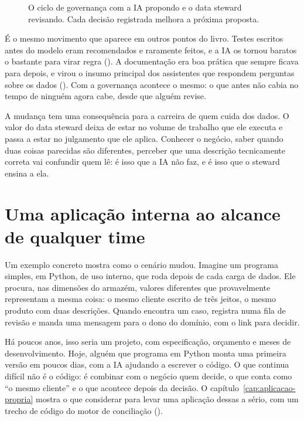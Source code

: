 \begin{figure}[htbp]
  \centering
  
  \caption{O ciclo de governança com a IA propondo e o data steward revisando. Cada
    decisão registrada melhora a próxima proposta.}
  \label{fig:governanca-ciclo}
\end{figure}

É o mesmo movimento que aparece em outros pontos do livro. Testes escritos antes do modelo
eram recomendados e raramente feitos, e a IA os tornou baratos o bastante para virar regra
(). A documentação era boa prática que sempre ficava para depois, e virou o
insumo principal dos assistentes que respondem perguntas sobre os dados
(). Com a governança acontece o mesmo: o que antes não cabia no
tempo de ninguém agora cabe, desde que alguém revise.

A mudança tem uma consequência para a carreira de quem cuida dos dados. O valor do data
steward deixa de estar no volume de trabalho que ele executa e passa a estar no julgamento
que ele aplica. Conhecer o negócio, saber quando duas coisas parecidas são diferentes,
perceber que uma descrição tecnicamente correta vai confundir quem lê: é isso que a IA não
faz, e é isso que o steward ensina a ela.


\section{Uma aplicação interna ao alcance de qualquer time}
\label{sec:gov-aplicacao-interna}

Um exemplo concreto mostra como o cenário mudou. Imagine um programa simples, em Python, de
uso interno, que roda depois de cada carga de dados. Ele procura, nas dimensões do armazém,
valores diferentes que provavelmente representam a mesma coisa: o mesmo cliente escrito de
três jeitos, o mesmo produto com duas descrições. Quando encontra um caso, registra numa
fila de revisão e manda uma mensagem para o dono do domínio, com o link para decidir.

Há poucos anos, isso seria um projeto, com especificação, orçamento e meses de
desenvolvimento. Hoje, alguém que programa em Python monta uma primeira versão em poucos
dias, com a IA ajudando a escrever o código. O que continua difícil não é o código: é
combinar com o negócio quem decide, o que conta como \enquote{o mesmo cliente} e o que
acontece depois da decisão. O capítulo~\ref{cap:aplicacao-propria} mostra o que considerar
para levar uma aplicação dessas a sério, com um trecho de código do motor de conciliação
().

